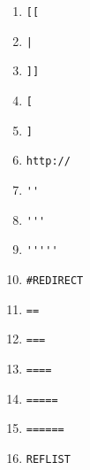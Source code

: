 \documentclass[a4paper,11pt]{article}
\begin{document}
\begin{center}
 \begin{enumerate}
\item\begin{verbatim}[[\end{verbatim} 
\item	\begin{verbatim}|\end{verbatim} 
\item	\begin{verbatim}]]\end{verbatim} 
\item	\begin{verbatim}[\end{verbatim} 
\item	\begin{verbatim}]\end{verbatim} 
\item	\begin{verbatim}http://\end{verbatim}
\item	\begin{verbatim}''\end{verbatim} 
\item	\begin{verbatim}'''\end{verbatim} 
\item	\begin{verbatim}'''''\end{verbatim} 
\item	\begin{verbatim}#REDIRECT\end{verbatim} 
\item	\begin{verbatim}==\end{verbatim} 
\item	\begin{verbatim}===\end{verbatim} 
\item	\begin{verbatim}====\end{verbatim} 
\item	\begin{verbatim}=====\end{verbatim} 
\item	\begin{verbatim}======\end{verbatim} 
\item	\begin{verbatim}REFLIST\end{verbatim}

\end{enumerate}
\end{center}
\end{document}
